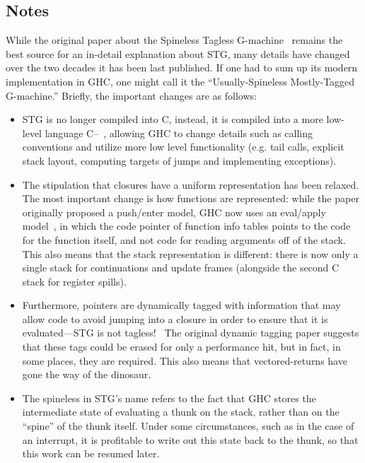 \subsection{Notes}


While the original paper about the Spineless Tagless
G-machine~\cite{PeytonJones1992} remains the best source for an
in-detail explanation about STG, many details have changed over the two
decades it has been last published.  If one had to sum up its modern
implementation in GHC, one might call it the ``Usually-Spineless
Mostly-Tagged G-machine.''  Briefly, the important changes are as
follows:

\begin{itemize}
    \item STG is no longer compiled into C, instead, it is
        compiled into a more low-level language C--~\cite{Jones1999}, allowing
        GHC to change details such as calling conventions and utilize
        more low level functionality (e.g. tail calls, explicit stack
        layout, computing targets of jumps and implementing exceptions).
    \item The stipulation that closures have a uniform representation
        has been relaxed.  The most important change is how functions
        are represented: while the paper originally proposed a push/enter
        model, GHC now uses an eval/apply model~\cite{Marlow2006}, in
        which the code pointer of function info tables points to the code
        for the function itself, and not code for reading arguments off of
        the stack.  This also means that the stack representation is
        different: there is now only a single stack for continuations and
        update frames (alongside the second C stack for register spills).
    \item Furthermore, pointers are dynamically tagged with information
        that may allow code to avoid jumping into a closure in order to
        ensure that it is evaluated---STG is not
        tagless!~\cite{Marlow2007}  The original dynamic tagging paper
        suggests that these tags could be erased for only a performance
        hit, but in fact, in some places, they are required.  This also
        means that vectored-returns have gone the way of the dinosaur.
    \item The spineless in STG's name refers to the fact that GHC stores
        the intermediate state of evaluating a thunk on the stack,
        rather than on the ``spine'' of the thunk itself.  Under some
        circumstances, such as in the case of an interrupt, it is
        profitable to write out this state back to the thunk, so that
        this work can be resumed later.~\cite{Reid1999} 
\end{itemize}
